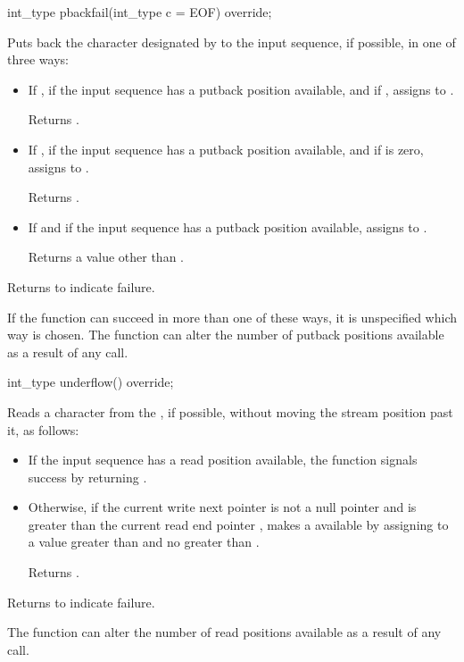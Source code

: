 %
\begin{itemdecl}
int_type pbackfail(int_type c = EOF) override;
\end{itemdecl}

\begin{itemdescr}
\pnum
Puts back the character designated by  to the input
sequence, if possible, in one of three ways:
\begin{itemize}
\item
If
,
if the input sequence has a putback position available, and if
,
assigns
to .

Returns .
\item
If
,
if the input sequence has a putback position available, and if
 is zero,
assigns  to
.

Returns
.
\item
If
and if the input sequence has a putback position available,
assigns
to .

Returns a value other than
.
\end{itemize}

\pnum
Returns
to indicate failure.

\pnum
\remarks
If the function can succeed in more than one of these ways, it is
unspecified which way is chosen.
%
The function can alter the number of putback
positions available as a result of any call.
\end{itemdescr}

%
\begin{itemdecl}
int_type underflow() override;
\end{itemdecl}

\begin{itemdescr}
\pnum
\effects
Reads a character from the
,
if possible, without moving the stream position past it, as follows:
\begin{itemize}
\item
If the input sequence has a read position available, the function
signals success by returning
.
\item
Otherwise, if
the current write next pointer  is not a null pointer and
is greater than the current read end pointer ,
makes a
available by
assigning to  a value greater than  and
no greater than .

Returns .
\end{itemize}

\pnum
Returns
to indicate failure.

\pnum
\remarks
The function can alter the number of read positions available as a
result of any call.
\end{itemdescr}

